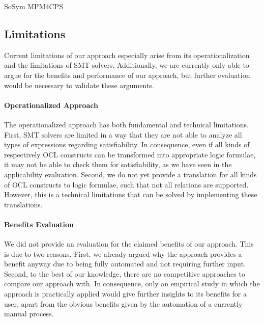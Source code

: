 \begin{copiedFrom}{SoSym MPM4CPS}




\subsection{Limitations}
\label{sec:evaluation:limitations}

Current limitations of our approach especially arise from its operationalization and the limitations of SMT solvers.
Additionally, we are currently only able to argue for the benefits and performance of our approach, but further evaluation would be necessary to validate these arguments.

\paragraph{Operationalized Approach}
The operationalized approach has both fundamental and technical limitations.
First, SMT solvers are limited in a way that they are not able to analyze all types of expressions regarding satisfiability.
In consequence, even if all kinds of \qvtr respectively OCL constructs can be transformed into appropriate logic formulae, it may not be able to check them for satisfiability, as we have seen in the applicability evaluation.
Second, we do not yet provide a translation for all kinds of OCL constructs to logic formulae, such that not all \qvtr relations are supported.
However, this is a technical limitations that can be solved by implementing these translations.

\paragraph{Benefits Evaluation}
We did not provide an evaluation for the claimed benefits of our approach.
This is due to two reasons.
First, we already argued why the approach provides a benefit anyway due to being fully automated and not requiring further input.
Second, to the best of our knowledge, there are no competitive approaches to compare our approach with.
In consequence, only an empirical study in which the approach is practically applied would give further insights to its benefits for a user, apart from the obvious benefits given by the automation of a currently manual process.


\end{copiedFrom}
